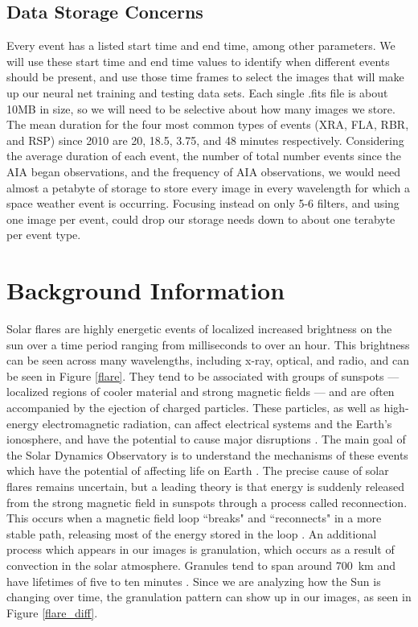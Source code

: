 \documentclass[12pt, letterpaper]{article}
\begin{document}
\subsection*{Data Storage Concerns}
Every event has a listed start time and end time, among other parameters. We will use these start time and end time values to identify when different events should be present, and use those time frames to select the images that will make up our neural net training and testing data sets. Each single .fits file is about 10MB in size, so we will need to be selective about how many images we store. The mean duration for the four most common types of events (XRA, FLA, RBR, and RSP) since 2010 are 20, 18.5, 3.75, and 48 minutes respectively. Considering the average duration of each event, the number of total number events since the AIA began observations, and the frequency of AIA observations, we would need almost a petabyte of storage to store every image in every wavelength for which a space weather event is occurring. Focusing instead on only 5-6 filters, and using one image per event, could drop our storage needs down to about one terabyte per event type.

\section*{Background Information}

Solar flares are highly energetic events of localized increased brightness on the sun over a time period ranging from milliseconds to over an hour. This brightness can be seen across many wavelengths, including x-ray, optical, and radio, and can be seen in Figure \ref{flare}. They tend to be associated with groups of sunspots — localized regions of cooler material and strong magnetic fields — and are often accompanied by the ejection of charged particles. These particles, as well as high-energy electromagnetic radiation, can affect electrical systems and the Earth’s ionosphere, and have the potential to cause major disruptions \cite{BOB}. The main goal of the Solar Dynamics Observatory is to understand the mechanisms of these events which have the potential of affecting life on Earth \cite{Pesnell2012}. The precise cause of solar flares remains uncertain, but a leading theory is that energy is suddenly released from the strong magnetic field in sunspots through a process called reconnection. This occurs when a magnetic field loop ``breaks" and ``reconnects" in a more stable path, releasing most of the energy stored in the loop \cite{BOB}. An additional process which appears in our images is granulation, which occurs as a result of convection in the solar atmosphere. Granules tend to span around 700~km and have lifetimes of five to ten minutes \cite{BOB}. Since we are analyzing how the Sun is changing over time, the granulation pattern can show up in our images, as seen in Figure \ref{flare_diff}.
\end{document}

